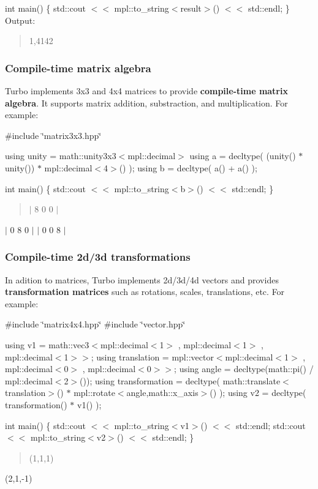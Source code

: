 int main() \{ std\+::cout $<$$<$ mpl\+::to\+\_\+string$<$result$>$() $<$$<$ std\+::endl; \} Output\+: \begin{quote}
1,4142 \end{quote}


\subsubsection*{Compile-\/time matrix algebra}

Turbo implements 3x3 and 4x4 matrices to provide {\bfseries compile-\/time matrix algebra}. It supports matrix addition, substraction, and multiplication. For example\+:

\#include \char`\"{}matrix3x3.\+hpp\char`\"{}

using unity = math\+::unity3x3$<$mpl\+::decimal$>$ using a = decltype( (unity() $\ast$ unity()) $\ast$ mpl\+::decimal$<$4$>$() ); using b = decltype( a() + a() );

int main() \{ std\+::cout $<$$<$ mpl\+::to\+\_\+string$<$b$>$() $<$$<$ std\+::endl; \} \begin{quote}
$\vert$ 8 0 0 $\vert$ \end{quote}
$\vert$ 0 8 0 $\vert$ $\vert$ 0 0 8 $\vert$

\subsubsection*{Compile-\/time 2d/3d transformations}

In adition to matrices, Turbo implements 2d/3d/4d vectors and provides {\bfseries transformation matrices} such as rotations, scales, translations, etc. For example\+:

\#include \char`\"{}matrix4x4.\+hpp\char`\"{} \#include \char`\"{}vector.\+hpp\char`\"{}

using v1 = math\+::vec3$<$mpl\+::decimal$<$1$>$ , mpl\+::decimal$<$1$>$ , mpl\+::decimal$<$1$>$$>$; using translation = mpl\+::vector$<$mpl\+::decimal$<$1$>$ , mpl\+::decimal$<$0$>$ , mpl\+::decimal$<$0$>$$>$; using angle = decltype(math\+::pi() / mpl\+::decimal$<$2$>$()); using transformation = decltype( math\+::translate$<$translation$>$() $\ast$ mpl\+::rotate$<$angle,math\+::x\+\_\+axis$>$() ); using v2 = decltype( transformation() $\ast$ v1() );

int main() \{ std\+::cout $<$$<$ mpl\+::to\+\_\+string$<$v1$>$() $<$$<$ std\+::endl; std\+::cout $<$$<$ mpl\+::to\+\_\+string$<$v2$>$() $<$$<$ std\+::endl; \} \begin{quote}
(1,1,1) \end{quote}
(2,1,-\/1)

